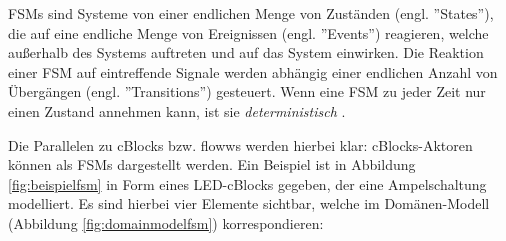 \acp{FSM} sind Systeme von einer endlichen Menge von Zuständen (engl. ''States''), die auf eine endliche Menge von Ereignissen (engl. ''Events'') reagieren, welche außerhalb des Systems auftreten und auf das System einwirken. Die Reaktion einer \ac{FSM} auf eintreffende Signale werden abhängig einer endlichen Anzahl von Übergängen (engl. ''Transitions'') gesteuert. Wenn eine \ac{FSM} zu jeder Zeit nur einen Zustand annehmen kann, ist sie \textit{deterministisch} \cite{hopcroft2013introduction}. 

Die Parallelen zu cBlocks bzw. flowws werden hierbei klar: cBlocks-Aktoren können als \acp{FSM} dargestellt werden. Ein Beispiel ist in Abbildung \ref{fig:beispielfsm} in Form eines LED-cBlocks gegeben, der eine Ampelschaltung modelliert. Es sind hierbei vier Elemente sichtbar, welche im Domänen-Modell (Abbildung \ref{fig:domainmodelfsm}) korrespondieren:
